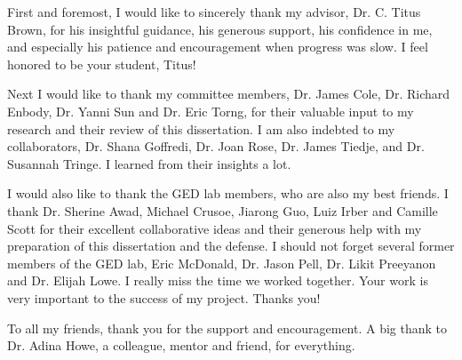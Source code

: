 First and foremost, I would like to sincerely thank my advisor, Dr. C. Titus 
Brown, for his insightful guidance, his generous support, his confidence in 
me, and especially his patience and encouragement when progress was slow. I 
feel honored to be your student, Titus!

Next I would like to thank my committee members, Dr. James Cole, Dr. Richard 
Enbody, Dr. Yanni Sun and Dr. Eric Torng, for their valuable input to my 
research and their review of this dissertation. I am also indebted to my 
collaborators, Dr. Shana Goffredi, Dr. Joan Rose, Dr. James Tiedje, and
Dr. Susannah Tringe. I learned from their insights a lot. 

I would also like to thank the GED lab members, who are also my best friends.
I thank Dr. Sherine Awad, Michael Crusoe, Jiarong Guo, Luiz Irber and Camille 
Scott for their excellent collaborative ideas and their generous help with my 
preparation of this dissertation and the defense. I should not forget several
former members of the GED lab, Eric McDonald, Dr. Jason Pell, Dr. Likit 
Preeyanon and Dr. Elijah Lowe. I really miss the time we worked together. Your 
work is very important to the success of my project. Thanks you!

To all my friends, thank you for the support and encouragement. A big thank
to Dr. Adina Howe, a colleague, mentor and friend, for everything. 


